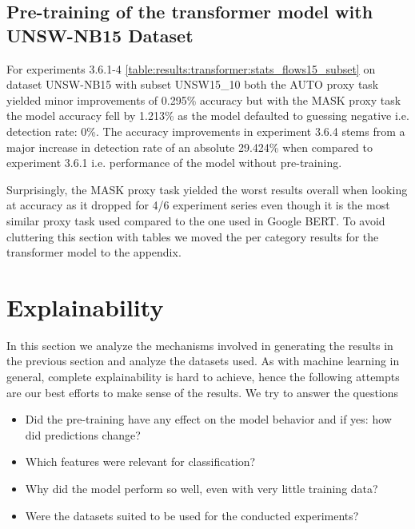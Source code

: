 





\subsection{Pre-training of the transformer model with UNSW-NB15 Dataset}

For experiments 3.6.1-4 \ref{table:results:transformer:stats_flows15_subset} on dataset UNSW-NB15 with subset UNSW15\_10 both the AUTO proxy task yielded minor improvements of 0.295\% accuracy but with the MASK proxy task the model accuracy fell by 1.213\% as the model defaulted to guessing negative i.e. detection rate: 0\%. The accuracy improvements in experiment 3.6.4 stems from a major increase in detection rate of an absolute 29.424\% when compared to experiment 3.6.1 i.e. performance of the model without pre-training. \par
Surprisingly, the MASK proxy task yielded the worst results overall when looking at accuracy as it dropped for 4/6 experiment series even though it is the most similar proxy task used compared to the one used in Google BERT. To avoid cluttering this section with tables we moved the per category results for the transformer model to the appendix.







\section{Explainability} \label{sec:results:explainability}

In this section we analyze the mechanisms involved in generating the results in the previous section and analyze the datasets used. As with machine learning in general, complete explainability is hard to achieve, hence the following attempts are our best efforts to make sense of the results. We try to answer the questions

\begin{itemize}
	\item Did the pre-training have any effect on the model behavior and if yes: how did predictions change?
	\item Which features were relevant for classification? 
	\item Why did the model perform so well, even with very little training data?
	\item Were the datasets suited to be used for the conducted experiments?
\end{itemize}

